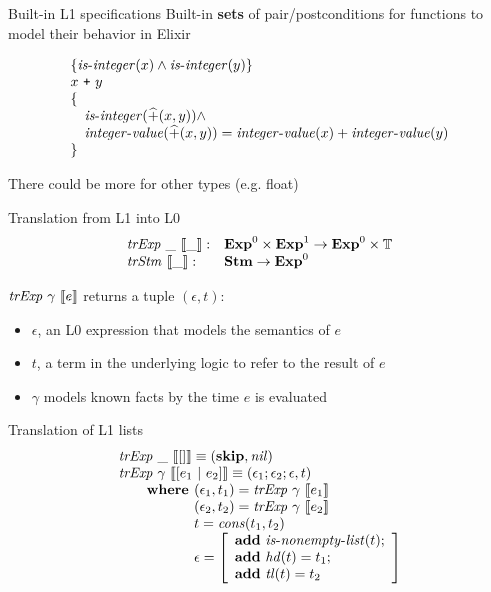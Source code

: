 \documentclass{beamer}
\begin{document}
  \begin{frame}{Built-in L1 specifications}
    Built-in \textbf{sets} of pair/postconditions for functions to 
    model their behavior in Elixir
    
    \[
      \begin{array}{l}
      \{ \mathit{is\mbox{-}integer}(x) \wedge \mathit{is\mbox{-}integer}(y) \}\\
      x~\texttt{+}~y\\
      \{ \\ 
      \quad\mathit{is\mbox{-}integer}(\widehat{+}(x, y)) \wedge \\
      \quad\mathit{integer\mbox{-}value}(\widehat{+}(x, y)) = \mathit{integer\mbox{-}value}(x) + \mathit{integer\mbox{-}value}(y) \\
      \}
      \end{array}
    \]

    There could be more for other types (e.g. float)
  \end{frame}
  \begin{frame}{Translation from L1 into L0}
    \[
      \begin{array}{ll}
        \mathit{trExp}~\_~\llbracket\_\rrbracket : & \mathbf{Exp}^{0} \times \mathbf{Exp}^{1} \rightarrow \mathbf{Exp}^{0} \times \mathbb{T}\\
        \mathit{trStm}~\llbracket\_\rrbracket : & \mathbf{Stm} \rightarrow \mathbf{Exp}^{0}
      \end{array}
    \]

    $\mathit{trExp}~\gamma~\llbracket e\rrbracket$ returns a tuple $(\epsilon, t)$:
    \begin{itemize}
      \item $\epsilon$, an L0 expression that models the semantics of $e$
      \item $t$, a term in the underlying logic to refer to the result of $e$
      \item $\gamma$ models known facts by the time $e$ is evaluated
    \end{itemize}
  \end{frame}
  \begin{frame}{Translation of L1 lists}
    \[
      \begin{array}{l}
      \trExp{\_}{[]} \equiv (
        \skipE, \mathit{nil}
      )\\
      \trExp{\gamma}{[e_1~|~e_2]} \equiv (\epsilon_1;\epsilon_2;\epsilon, t)\\
        \qquad \textbf{where } (\epsilon_1, t_1) = \trExp{\gamma}{e_1}\\ 
        \qquad \phantom{\textbf{where }} (\epsilon_2, t_2) = \trExp{\gamma}{e_2}\\ 
        \qquad \phantom{\textbf{where }} t = \mathit{cons}(t_1, t_2)\\ 
        \qquad \phantom{\textbf{where }} \epsilon = \left[
          \begin{array}{l}
            \addE~\isnelist{t};\\
            \addE~\mathit{hd}(t) = t_1;\\
            \addE~\mathit{tl}(t) = t_2\\
          \end{array}
        \right]
      \end{array}
    \]
  \end{frame}
\end{document}
